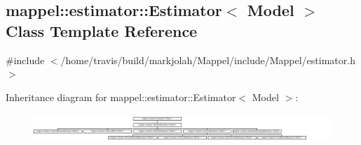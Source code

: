 \hypertarget{classmappel_1_1estimator_1_1Estimator}{}\subsection{mappel\+:\+:estimator\+:\+:Estimator$<$ Model $>$ Class Template Reference}
\label{classmappel_1_1estimator_1_1Estimator}


{\ttfamily \#include $<$/home/travis/build/markjolah/\+Mappel/include/\+Mappel/estimator.\+h$>$}

Inheritance diagram for mappel\+:\+:estimator\+:\+:Estimator$<$ Model $>$\+:\begin{figure}[H]
\begin{center}
\leavevmode
\includegraphics[height=1.069723cm]{classmappel_1_1estimator_1_1Estimator}
\end{center}
\end{figure}
